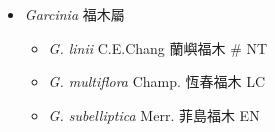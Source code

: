 
  \begin{itemize}
 \item[] \textit{Garcinia} 福木屬
                                
  \begin{itemize}
        \item[] \textit{G. linii} C.E.Chang  蘭嶼福木  \# NT
        \item[] \textit{G. multiflora} Champ.  恆春福木   LC
        \item[] \textit{G. subelliptica} Merr.  菲島福木   EN
  \end{itemize}
  \end{itemize}
